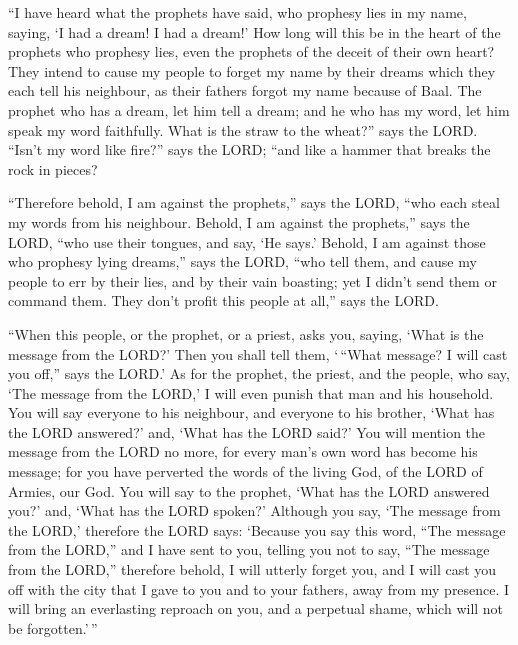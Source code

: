  ``I have heard what the prophets have said, who prophesy
lies in my name, saying, `I had a dream! I had a dream!' 
How long will this be in the heart of the prophets who prophesy lies,
even the prophets of the deceit of their own heart?  They
intend to cause my people to forget my name by their dreams which they
each tell his neighbour, as their fathers forgot my name because of
Baal.  The prophet who has a dream, let him tell a dream;
and he who has my word, let him speak my word faithfully. What is the
straw to the wheat?'' says the LORD.  ``Isn't my word like
fire?'' says the LORD; ``and like a hammer that breaks the rock in
pieces?

 ``Therefore behold, I am against the prophets,'' says the
LORD, ``who each steal my words from his neighbour. 
Behold, I am against the prophets,'' says the LORD, ``who use their
tongues, and say, `He says.'  Behold, I am against those
who prophesy lying dreams,'' says the LORD, ``who tell them, and cause
my people to err by their lies, and by their vain boasting; yet I didn't
send them or command them. They don't profit this people at all,'' says
the LORD.

 ``When this people, or the prophet, or a priest, asks you,
saying, `What is the message from the LORD?' Then you shall tell them,
`\,``What message? I will cast you off,'' says the LORD.' 
As for the prophet, the priest, and the people, who say, `The message
from the LORD,' I will even punish that man and his household.
 You will say everyone to his neighbour, and everyone to
his brother, `What has the LORD answered?' and, `What has the LORD
said?'  You will mention the message from the LORD no more,
for every man's own word has become his message; for you have perverted
the words of the living God, of the LORD of Armies, our God.
 You will say to the prophet, `What has the LORD answered
you?' and, `What has the LORD spoken?'  Although you say,
`The message from the LORD,' therefore the LORD says: `Because you say
this word, ``The message from the LORD,'' and I have sent to you,
telling you not to say, ``The message from the LORD,'' 
therefore behold, I will utterly forget you, and I will cast you off
with the city that I gave to you and to your fathers, away from my
presence.  I will bring an everlasting reproach on you, and
a perpetual shame, which will not be forgotten.'\,''

